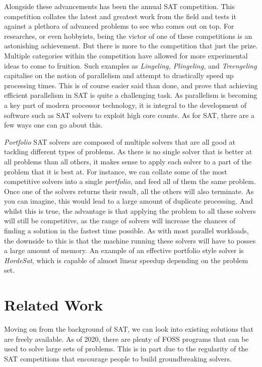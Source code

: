 \documentclass{article}
\begin{document}
Alongside these advancements has been the annual SAT competition. This competition collates the
latest and greatest work from the field and tests it against a plethora of advanced problems to see
who comes out on top. For researches, or even hobbyists, being the victor of one of these
competitions is an astonishing achievement. But there is more to the competition that just the
prize. Multiple categories within the competition have allowed for more experimental ideas to come
to fruition. Such examples as \textit{Lingeling, Plingeling,} and \textit{Treengeling} capitalise on
the notion of parallelism and attempt to drastically speed up processing times. This is of course
easier said than done, and prove that achieving efficient parallelism in SAT is quite a challenging
task. As parallelism is becoming a key part of modern processor technology, it is integral to the
development of software such as SAT solvers to exploit high core counts. As for SAT, there are a few
ways one can go about this.

\textit{Portfolio} SAT solvers are composed of multiple solvers that are all good at tackling
different types of problems. As there is no single solver that is better at all problems than all
others, it makes sense to apply each solver to a part of the problem that it is best at. For
instance, we can collate some of the most competitive solvers into a single \textit{portfolio}, and
feed all of them the same problem. Once one of the solvers returns their result, all the others will
also terminate. As you can imagine, this would lead to a large amount of duplicate processing. And
whilst this is true, the advantage is that applying the problem to all these solvers will still be
competitive, as the range of solvers will increase the chances of finding a solution in the fastest
time possible. As with most parallel workloads, the downside to this is that the machine running
these solvers will have to posses a large amount of memory. An example of an effective portfolio
style solver is \textit{HordeSat}\cite{horde}, which is capable of almost linear speedup depending on the
problem set.

\section{Related Work}
Moving on from the background of SAT, we can look into existing solutions that are freely available.
As of 2020, there are plenty of FOSS programs that can be used to solve large sets of problems. This
is in part due to the regularity of the SAT competitions that encourage people to build
groundbreaking solvers.
\end{document}

